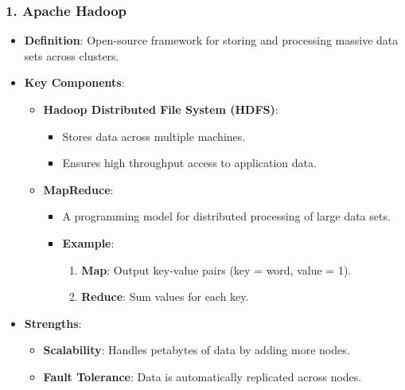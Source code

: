 \documentclass[aspectratio=169]{beamer}
\begin{document}
\begin{frame}[fragile]
    \frametitle{1. Apache Hadoop}
    \begin{itemize}
        \item \textbf{Definition}: Open-source framework for storing and processing massive data sets across clusters.
        \item \textbf{Key Components}:
            \begin{itemize}
                \item \textbf{Hadoop Distributed File System (HDFS)}: 
                    \begin{itemize}
                        \item Stores data across multiple machines.
                        \item Ensures high throughput access to application data.
                    \end{itemize}
                \item \textbf{MapReduce}:
                    \begin{itemize}
                        \item A programming model for distributed processing of large data sets.
                        \item \textbf{Example}: 
                            \begin{enumerate}
                                \item \textbf{Map}: Output key-value pairs (key = word, value = 1).
                                \item \textbf{Reduce}: Sum values for each key.
                            \end{enumerate}
                    \end{itemize}
                \end{itemize}
        \item \textbf{Strengths}:
            \begin{itemize}
                \item \textbf{Scalability}: Handles petabytes of data by adding more nodes.
                \item \textbf{Fault Tolerance}: Data is automatically replicated across nodes.
            \end{itemize}
    \end{itemize}
\end{frame}
\end{document}
